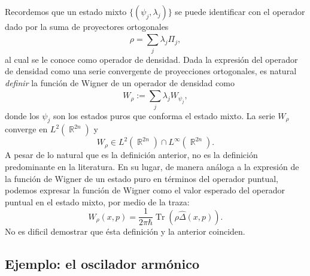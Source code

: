 \documentclass[a4paper]{report}
\DeclareMathOperator{\R}{\mathbb{R}}
\DeclareMathOperator{\Tr}{Tr}
\begin{document}
  Recordemos que un estado mixto $\{(\psi_j,\lambda_j)\}$ se
  puede identificar con el operador dado por la suma de
  proyectores ortogonales
  \begin{equation}
    \rho = \sum_{j}^{} \lambda_j \Pi_j,
  \end{equation} 
  al cual se le conoce como operador de densidad. Dada la
  expresión del operador de densidad como una serie
  convergente de proyecciones ortogonales, es natural
  \textit{definir} la función de Wigner de un operador de
  densidad como
  \begin{equation}
    W_\rho 
    := \sum_{j}^{} \lambda_j W_{\psi_j},
  \end{equation} 
  donde los $\psi_j$ son los estados puros que conforma el
  estado mixto. La serie $W_\rho$ converge en $L^2(\R^{2n})$
  y 
  \begin{equation}
    W_\rho \in L^2(\R^{2n}) \cap L^{\infty}(\R^{2n}).
  \end{equation}
  A pesar de lo natural que es la definición anterior, no es
  la definición predominante en la literatura. En su lugar,
  de manera análoga a la expresión de la función de Wigner
  de un estado puro en términos del operador puntual,
  podemos expresar la función de Wigner como el valor
  esperado del operador puntual en el estado mixto, por
  medio de la traza:
  \begin{equation}
    W_\rho(x,p)
    = \frac{1}{2\pi\hbar} \Tr\left( \rho \hat \Delta(x,p)
    \right).
  \end{equation} 
  No es dificil demostrar que ésta definición y la anterior
  coinciden.

  \subsection{Ejemplo: el oscilador armónico}
\end{document}
